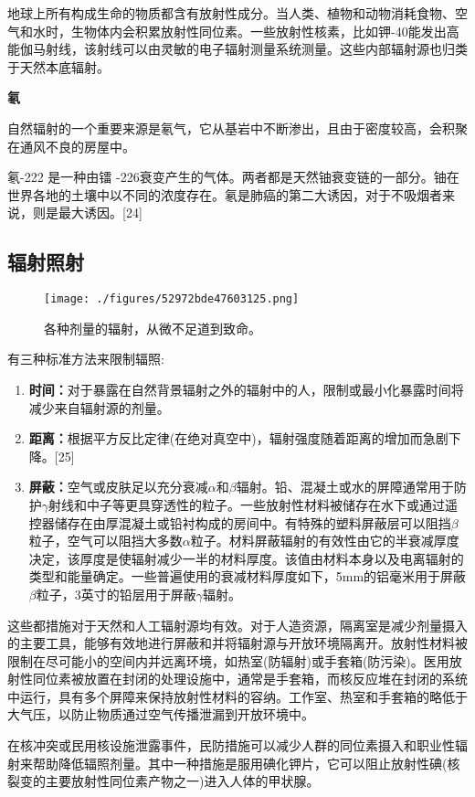 地球上所有构成生命的物质都含有放射性成分。当人类、植物和动物消耗食物、空气和水时，生物体内会积累放射性同位素。一些放射性核素，比如钾-40能发出高能伽马射线，该射线可以由灵敏的电子辐射测量系统测量。这些内部辐射源也归类于天然本底辐射。

\textbf{氡}

自然辐射的一个重要来源是氡气，它从基岩中不断渗出，且由于密度较高，会积聚在通风不良的房屋中。

氡-222 是一种由镭 -226衰变产生的气体。两者都是天然铀衰变链的一部分。铀在世界各地的土壤中以不同的浓度存在。氡是肺癌的第二大诱因，对于不吸烟者来说，则是最大诱因。[24]

\subsection{辐射照射}
\begin{figure}[ht]
\centering
\texttt{[image: ./figures/52972bde47603125.png]}
\caption{各种剂量的辐射，从微不足道到致命。} \label{fig_DLFS_8}
\end{figure}
有三种标准方法来限制辐照:
\begin{enumerate}
\item \textbf{时间：}对于暴露在自然背景辐射之外的辐射中的人，限制或最小化暴露时间将减少来自辐射源的剂量。
\item \textbf{距离：}根据平方反比定律(在绝对真空中)，辐射强度随着距离的增加而急剧下降。[25]
\item \textbf{屏蔽：}空气或皮肤足以充分衰减$\alpha$和$\beta$辐射。铅、混凝土或水的屏障通常用于防护$\gamma$射线和中子等更具穿透性的粒子。一些放射性材料被储存在水下或通过遥控器储存在由厚混凝土或铅衬构成的房间中。有特殊的塑料屏蔽层可以阻挡$\beta$粒子，空气可以阻挡大多数$\alpha$粒子。材料屏蔽辐射的有效性由它的半衰减厚度决定，该厚度是使辐射减少一半的材料厚度。该值由材料本身以及电离辐射的类型和能量确定。一些普遍使用的衰减材料厚度如下，5mm的铝毫米用于屏蔽$\beta$粒子，3英寸的铅层用于屏蔽$\gamma$辐射。
\end{enumerate}
这些都措施对于天然和人工辐射源均有效。对于人造资源，隔离室是减少剂量摄入的主要工具，能够有效地进行屏蔽和并将辐射源与开放环境隔离开。放射性材料被限制在尽可能小的空间内并远离环境，如热室(防辐射)或手套箱(防污染)。医用放射性同位素被放置在封闭的处理设施中，通常是手套箱，而核反应堆在封闭的系统中运行，具有多个屏障来保持放射性材料的容纳。工作室、热室和手套箱的略低于大气压，以防止物质通过空气传播泄漏到开放环境中。

在核冲突或民用核设施泄露事件，民防措施可以减少人群的同位素摄入和职业性辐射来帮助降低辐照剂量。其中一种措施是服用碘化钾片，它可以阻止放射性碘(核裂变的主要放射性同位素产物之一)进入人体的甲状腺。


